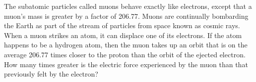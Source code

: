         The subatomic particles called muons behave exactly like
        electrons, except that a muon's mass is greater by a factor
        of 206.77.  Muons are continually bombarding the Earth as
        part of the stream of particles from space known as cosmic
        rays.  When a muon strikes an atom, it can displace one of
        its electrons.  If the atom happens to be a hydrogen atom,
        then the muon takes up an orbit that is on the average
        206.77 times closer to the proton than the orbit of the
        ejected electron.  How many times greater is the electric
        force experienced by the muon than that previously
        felt by the electron?\answercheck
